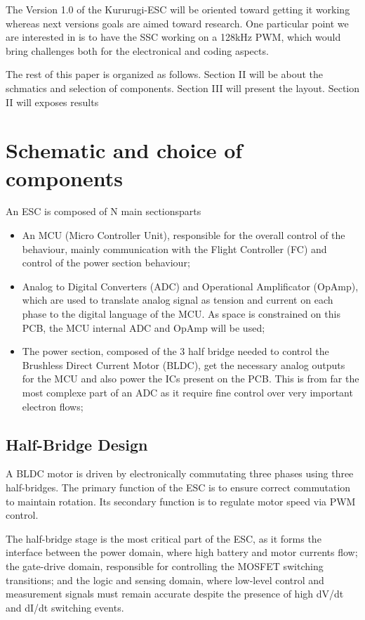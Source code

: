 \documentclass[a4paper, 10pt, conference]{IEEEtran} %
\begin{document}
The Version 1.0 of the Kururugi-ESC will be oriented toward getting it working whereas next versions goals are aimed toward research. One particular point we are interested in is to have the SSC working on a 128kHz PWM, which would bring challenges both for the electronical and coding aspects.

The rest of this paper is organized as follows. Section II will be about the schmatics and selection of components. Section III will present the layout. Section II will exposes results


\section{Schematic and choice of components}

An ESC is composed of N main sectionsparts
\begin{itemize}
    \item An MCU (Micro Controller Unit), responsible for the overall control of the behaviour, mainly communication with the Flight Controller (FC) and control of the power section behaviour;
    \item Analog to Digital Converters (ADC) and Operational Amplificator (OpAmp), which are used to translate analog signal as tension and current on each phase to the digital language of the MCU. As space is constrained on this PCB, the MCU internal ADC and OpAmp will be used;
    \item The power section, composed of the 3 half bridge needed to control the Brushless Direct Current Motor (BLDC), get the necessary analog outputs for the MCU and also power the ICs present on the PCB. This is from far the most complexe part of an ADC as it require fine control over very important electron flows;
\end{itemize}

\subsection{Half-Bridge Design}

A BLDC motor is driven by electronically commutating three phases using three half-bridges. The primary function of the ESC is to ensure correct commutation to maintain rotation. Its secondary function is to regulate motor speed via PWM control.

The half-bridge stage is the most critical part of the ESC, as it forms the interface between the power domain, where high battery and motor currents flow; the gate-drive domain, responsible for controlling the MOSFET switching transitions; and the logic and sensing domain, where low-level control and measurement signals must remain accurate despite the presence of high dV/dt and dI/dt switching events.
\end{document}
